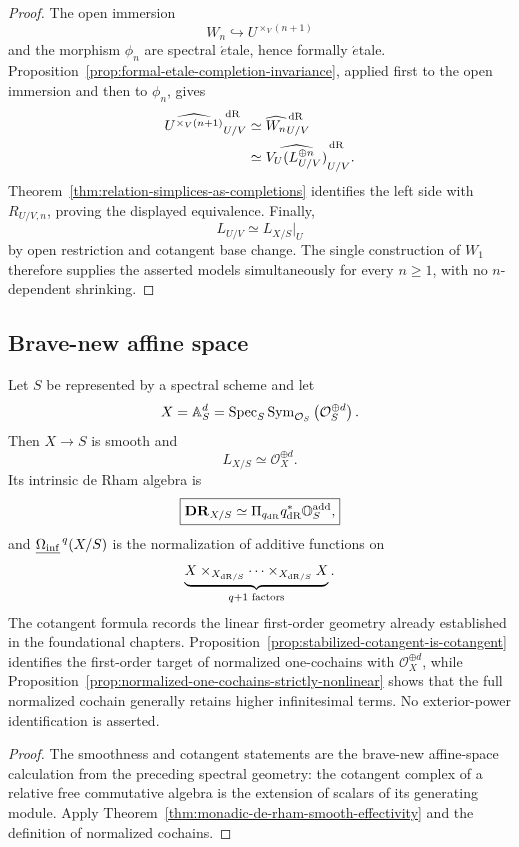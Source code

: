 \begin{proof}
The open immersion
\[
    W_n\hookrightarrow U^{\times_V(n+1)}
\]
and the morphism \(\phi_n\) are spectral \(\acute{e}\)tale, hence formally
\(\acute{e}\)tale.  Proposition~\ref{prop:formal-etale-completion-invariance}, applied first to the
open immersion and then to \(\phi_n\), gives
\[
\begin{aligned}
    \widehat{U^{\times_V(n+1)}}^{\,\mathrm{dR}}_{U/V}
    &\simeq
    \widehat{W_n}^{\,\mathrm{dR}}_{U/V}
    \\
    &\simeq
    \widehat{V_U(L_{U/V}^{\oplus n})}^{\,\mathrm{dR}}_{U/V}.
\end{aligned}
\]
Theorem~\ref{thm:relation-simplices-as-completions} identifies the left side with
\(R_{U/V,n}\), proving the displayed equivalence.  Finally,
\[
    L_{U/V}\simeq L_{X/S}|_U
\]
by open restriction and cotangent base change.  The single construction of \(W_1\) therefore
supplies the asserted models simultaneously for every \(n\geq1\), with no \(n\)-dependent
shrinking.
\end{proof}

\subsection{Brave-new affine space}

\begin{proposition}
\label{prop:monadic-de-rham-affine-space}
Let \(S\) be represented by a spectral scheme and let
\[
    X=\mathbb A_S^d
    =
    \operatorname{Spec}_S
    \operatorname{Sym}_{\mathcal O_S}
    \left(
        \mathcal O_S^{\oplus d}
    \right).
\]
Then \(X\to S\) is smooth and
\[
    L_{X/S}\simeq\mathcal O_X^{\oplus d}.
\]
Its intrinsic de Rham algebra is
\[
\boxed{
    \mathbf{DR}_{X/S}
    \simeq
    \Pi_{q_{\mathrm{dR}}}q_{\mathrm{dR}}^*\mathbb O_S^{\mathrm{add}},
}
\]
and \(\underline{\Omega_{\mathrm{inf}}}^{\,q}(X/S)\) is the normalization of additive functions on
\[
    \underbrace{
        X\times_{X_{\mathrm{dR}/S}}\cdots\times_{X_{\mathrm{dR}/S}}X
    }_{q+1\text{ factors}}.
\]
The cotangent formula records the linear first-order geometry already established in the
foundational chapters.  Proposition~\ref{prop:stabilized-cotangent-is-cotangent} identifies the
first-order target of normalized one-cochains with \(\mathcal O_X^{\oplus d}\), while
Proposition~\ref{prop:normalized-one-cochains-strictly-nonlinear} shows that the full normalized
cochain generally retains higher infinitesimal terms.  No exterior-power identification is asserted.
\end{proposition}

\begin{proof}
The smoothness and cotangent statements are the brave-new affine-space calculation from the
preceding spectral geometry:
the cotangent complex of a relative free commutative algebra is the extension of scalars of its
generating module.  Apply Theorem~\ref{thm:monadic-de-rham-smooth-effectivity} and the definition of
normalized cochains.
\end{proof}

